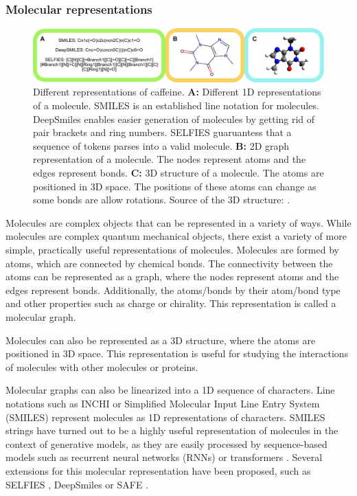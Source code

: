\subsubsection{Molecular representations}

\begin{figure}
    \centering
    \includegraphics[width=\textwidth]{figures/representations/representations.pdf}
    \caption{Different representations of caffeine. \textbf{A:} 
    Different 1D representations of a molecule. SMILES is an established 
    line notation for molecules. DeepSmiles enables easier generation of
    molecules by getting rid of pair brackets and ring numbers. SELFIES
    guaruantess that a sequence of tokens parses into a valid molecule.
    \textbf{B:} 2D graph representation of a molecule. The nodes represent
    atoms and the edges represent bonds. 
    \textbf{C:} 3D structure of a molecule. The atoms are positioned in 3D
    space. The positions of these atoms can change as some bonds are 
    allow rotations. Source of the 3D structure: \citep{EnglishCaffeine3D2010}.
    \label{fig:molecular-graph}}
\end{figure}
Molecules are complex objects that can be represented in a variety of ways.
While molecules are complex quantum mechanical objects, there exist 
a variety of more simple, practically useful representations of molecules.
Molecules are formed by atoms, which are connected by chemical bonds.
The connectivity between the atoms can be represented as a graph, where
the nodes represent atoms and the edges represent bonds. Additionally,
the atoms/bonds by their atom/bond type and other properties such as
charge or chirality. This representation is called a molecular graph.

Molecules can also be represented as a 3D structure, where the atoms are
positioned in 3D space. This representation is useful for studying the
interactions of molecules with other molecules or proteins. 

Molecular graphs can also be linearized into a 1D sequence of characters. Line
notations such as INCHI \citep{todo} or Simplified Molecular Input Line Entry
System (SMILES) \citep{weiningerSMILESChemicalLanguage1988} represent molecules
as 1D representations of characters. SMILES strings have turned out to be a
highly useful representation of molecules in the context of generative models,
as they are easily processed by sequence-based models such as recurrent neural
networks (RNNs) or transformers \citep{vaswaniAttentionAllYou2017}. Several
extensions for this molecular representation have been proposed, such as SELFIES
\citep{krennSELFIESFutureMolecular2022}, DeepSmiles
\citep{oboyleDeepSMILESAdaptationSMILES2018} or SAFE
\citep{noutahiGottaBeSAFE2023}. 

